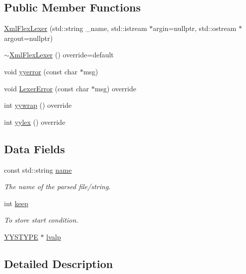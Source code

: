 \subsection*{Public Member Functions}
\begin{DoxyCompactItemize}
\item 
\hyperlink{structXmlFlexLexer_a8afc2bc35a44be59ca80013fb2772468}{Xml\+Flex\+Lexer} (std\+::string \+\_\+name, std\+::istream $\ast$argin=nullptr, std\+::ostream $\ast$argout=nullptr)
\item 
\hyperlink{structXmlFlexLexer_ad0d2dd2e6a90c700b6769a31d624210b}{$\sim$\+Xml\+Flex\+Lexer} () override=default
\item 
void \hyperlink{structXmlFlexLexer_a8580b2fc87fbe832fa75851217e82552}{yyerror} (const char $\ast$msg)
\item 
void \hyperlink{structXmlFlexLexer_a06098f140d995d7130576a4f60790999}{Lexer\+Error} (const char $\ast$msg) override
\item 
int \hyperlink{structXmlFlexLexer_a2714688373ece5a7dbc563c784968c9d}{yywrap} () override
\item 
int \hyperlink{structXmlFlexLexer_aa87fe47aa43520b34e7e638b8c16bc81}{yylex} () override
\end{DoxyCompactItemize}
\subsection*{Data Fields}
\begin{DoxyCompactItemize}
\item 
const std\+::string \hyperlink{structXmlFlexLexer_a5bef8cd5715705713c5bd3e27d07eb09}{name}
\begin{DoxyCompactList}\small\item\em The name of the parsed file/string. \end{DoxyCompactList}\item 
int \hyperlink{structXmlFlexLexer_a7abf53697b8a3c3888ff5731fffbdd61}{keep}
\begin{DoxyCompactList}\small\item\em To store start condition. \end{DoxyCompactList}\item 
\hyperlink{asn__parser_8cpp_a2ceb5b985e149f18e018b142cfdd7264}{Y\+Y\+S\+T\+Y\+PE} $\ast$ \hyperlink{structXmlFlexLexer_a9413bfda6343c736a991b705180d6900}{lvalp}
\end{DoxyCompactItemize}


\subsection{Detailed Description}


